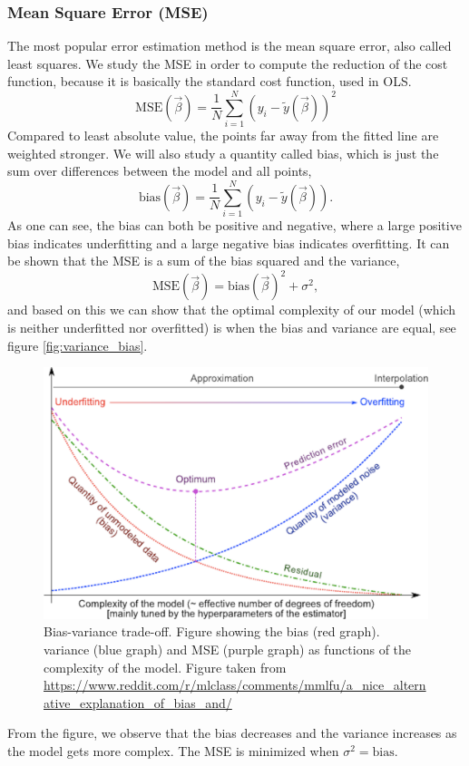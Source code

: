 \subsubsection{Mean Square Error (MSE)} \label{sec:MSE}
The most popular error estimation method is the mean square error, also called least squares. \cite{Hastie} We study the MSE in order to compute the reduction of the cost function, because it is basically the standard cost function, used in OLS. 
\begin{equation}
\text{MSE}(\vec{\beta})=\frac{1}{N}\sum_{i=1}^N(y_i-\tilde{y}(\vec{\beta}))^2
\end{equation}
Compared to least absolute value, the points far away from the fitted line are weighted stronger. We will also study a quantity called bias, which is just the sum over differences between the model and all points,
\begin{equation}
\text{bias}(\vec{\beta})=\frac{1}{N}\sum_{i=1}^N(y_i-\tilde{y}(\vec{\beta})).
\end{equation}
As one can see, the bias can both be positive and negative, where a large positive bias indicates underfitting and a large negative bias indicates overfitting. \cite{Berkley} It can be shown that the MSE is a sum of the bias squared and the variance,
\begin{equation}
\text{MSE}(\vec{\beta})=\text{bias}(\vec{\beta})^2+\sigma^2, 
\end{equation}
and based on this we can show that the optimal complexity of our model (which is neither underfitted nor overfitted) is when the bias and variance are equal, see figure \eqref{fig:variance_bias}.
 \begin{figure} [h]
	\centering
	\includegraphics[scale=0.3]{../plots/variance_bias.png}
	\caption{Bias-variance trade-off. Figure showing the bias (red graph). variance (blue graph) and MSE (purple graph) as functions of the complexity of the model. Figure taken from \url{https://www.reddit.com/r/mlclass/comments/mmlfu/a_nice_alternative_explanation_of_bias_and/}}
	\label{fig:variance_bias}
\end{figure}
From the figure, we observe that the bias decreases and the variance increases as the model gets more complex. The MSE is minimized when $\sigma^2=\text{bias}$. 

